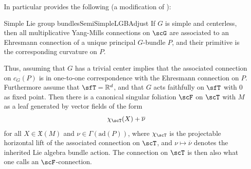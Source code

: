 \documentclass[reqno,a4paper,oneside]{amsart}
\theoremstyle{plain}
\theoremstyle{remark}
\newtheorem{remark}[theorem]{Remarks}
\theoremstyle{definition}
\begin{document}
    
    In particular \cite{Fischer:2401.05966} provides the following (a modification of \cite{blazquez2022group}):
    
    \begin{lemmata}{Simple Lie group bundles}{SemiSimpleLGBAdjust}
        If $G$ is simple and centerless, then all multiplicative Yang-Mills connections on $\scG$ are associated to an Ehresmann connection of a unique principal $G$-bundle $P$, and their primitive is the corresponding curvature on $P$.
    \end{lemmata}
		
		Thus, assuming that $G$ has a trivial center implies that the associated connection on $c_G(P)$ is in one-to-one correspondence with the Ehresmann connection on $P$. Furthermore assume that $\sfT = \mathbb{R}^d$, and that $G$ acts faithfully on $\sfT$ with 0 as fixed point. Then there is a canonical singular foliation $\scF$ on $\scT$ with $M$ as a leaf generated by vector fields of the form
    \begin{equation}\label{anchor}
        \chi_\scT(X) + \overline{\nu}
    \end{equation}
    for all $X \in \mathfrak{X}(M)$ and $\nu \in \Gamma(\mathrm{ad}(P))$, where $\chi_\scT$ is the projectable horizontal lift of the associated connection on $\scT$, and $\nu \mapsto \overline{\nu}$ denotes the inherited Lie algebra bundle action. The connection on $\scT$ is then also what one calls an $\scF$-connection.
    
\end{document}
